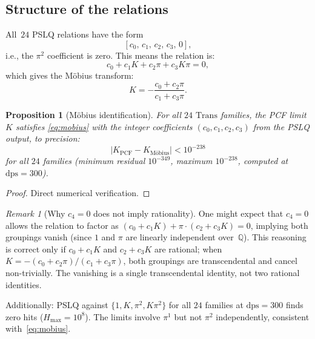 \documentclass{amsart}
\newtheorem{proposition}[theorem]{Proposition}
\theoremstyle{definition}
\theoremstyle{remark}
\newtheorem{remark}[theorem]{Remark}
\newcommand{\Trans}{\mathrm{Trans}}
\newcommand{\dps}{\mathrm{dps}}
\newcommand{\abs}[1]{\lvert #1 \rvert}
\begin{document}
\subsection{Structure of the relations}\label{ss:structure}

All~$24$ PSLQ relations have the form
\[
  [c_0,\, c_1,\, c_2,\, c_3,\, 0],
\]
i.e., the $\pi^2$ coefficient is zero.
This means the relation is:
\begin{equation}\label{eq:relation}
  c_0 + c_1 K + c_2 \pi + c_3 K\pi = 0,
\end{equation}
which gives the M\"obius transform:
\begin{equation}\label{eq:mobius}
  K = -\frac{c_0 + c_2 \pi}{c_1 + c_3 \pi}.
\end{equation}

\begin{proposition}[M\"obius identification]\label{prop:mobius}
For all $24$ $\Trans$ families, the PCF limit~$K$ satisfies
\eqref{eq:mobius} with the integer coefficients
$(c_0, c_1, c_2, c_3)$ from the PSLQ output, to precision:
\begin{equation}\label{eq:residual}
  \abs{K_{\mathrm{PCF}} - K_{\text{M\"obius}}} < 10^{-238}
\end{equation}
for all $24$ families (minimum residual $10^{-349}$, maximum $10^{-238}$,
computed at $\dps = 300$).
\end{proposition}

\begin{proof}
Direct numerical verification.
\end{proof}

\begin{remark}[Why $c_4 = 0$ does not imply rationality]\label{rem:c4}
One might expect that $c_4 = 0$ allows the relation to factor as
$(c_0 + c_1 K) + \pi \cdot (c_2 + c_3 K) = 0$, implying both groupings
vanish (since $1$ and $\pi$ are linearly independent over~$\mathbb{Q}$).
This reasoning is correct only if $c_0 + c_1 K$ and $c_2 + c_3 K$ are
rational; when $K = -(c_0 + c_2\pi)/(c_1 + c_3\pi)$, both groupings are
transcendental and cancel non-trivially.  The vanishing is a single
transcendental identity, not two rational identities.

Additionally: PSLQ against $\{1, K, \pi^2, K\pi^2\}$ for all $24$
families at $\dps = 300$ finds zero hits ($H_{\max} = 10^8$).  The limits
involve $\pi^1$ but not $\pi^2$ independently, consistent
with~\eqref{eq:mobius}.
\end{remark}
\end{document}
